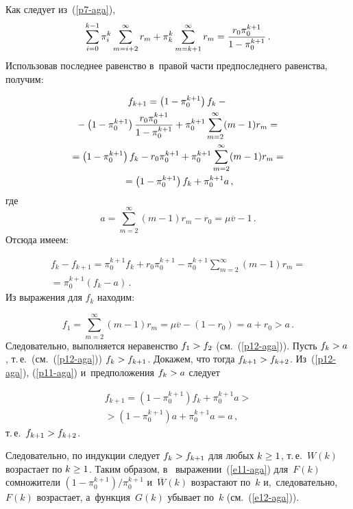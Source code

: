 \begin{multicols}{2}
{Как следует из~(\ref{p7-aga}),
$$
\sum\limits_{i=0}^{k-1} \pi_i^k \sum\limits^\infty_{m=i+2} r_m +\pi_k^k 
\sum\limits^\infty_{m=k+1} r_m = \displaystyle\frac{\displaystyle r_0 \pi_0^{k+1}\mathstrut}{\displaystyle 1-\pi_0^{k+1}\mathstrut}\,.
$$
Использовав последнее равенство в~правой части предпоследнего равенства, 
получим:

\noindent
\begin{multline}
f_{k+1} =\left(1-\pi_0^{k+1}\right) f_k -{}\\
{}-\left( 1-\pi_0^{k+1}\right) 
\displaystyle\frac{\displaystyle r_0\pi_0^{k+1}\mathstrut}{\displaystyle 1-\pi_0^{k+1}\mathstrut}+ \pi_0^{k+1}\sum\limits^\infty_{m=2} (m-
1)r_m={}
\\
{}=\left( 1-\pi_0^{k+1}\right) f_k - r_0 \pi_0^{k+1} +\pi_0^{k+1} 
\sum\limits^\infty_{m=2} (m-1)r_m ={}\\
{}=\left( 1-\pi_0^{k+1}\right) f_k + \pi_0^{k+1} 
a\,,
\label{p11-aga}
\end{multline}
где
$$
a=\sum\limits^\infty_{m=2} (m-1) r_m -r_0 =\mu\overline{v}-1\,.
$$
Отсюда имеем:

\pagebreak

\noindent
\begin{multline}
f_k-f_{k+1} =\pi_0^{k+1} f_k +r_0\pi_0^{k+1} -\pi_0^{k+1} 
\sum\limits^\infty_{m=2} (m-1) r_m ={}\\
{}= \pi_0^{k+1}\left( f_k-a\right)\,.
\label{p12-aga}
\end{multline}
Из выражения для $f_k$ находим:


\noindent
$$
f_1=\sum\limits^\infty_{m=2} (m-1)r_m =\mu\overline{v} -\left( 1-r_0\right) 
=a+r_0> a\,.
$$
Следовательно, выполняется неравенство $f_1\hm> f_2$ (см.~(\ref{p12-aga})). 
Пусть $f_k\hm>a$, т.\,е.\ (см.~(\ref{p12-aga})) $f_k\hm> f_{k+1}$. Докажем, что 
тогда $f_{k+1}\hm> f_{k+2}$. Из~(\ref{p12-aga}), (\ref{p11-aga}) 
и~предположения $f_k\hm>a$ следует

\vspace*{-6pt}

\noindent
\begin{multline*}
f_{k+1} =\left( 1-\pi_0^{k+1}\right) f_k +\pi_0^{k+1} a> {}\\
{}>\left( 1-\pi_0^{k+1}\right) 
a +\pi_0^{k+1} a=a\,,
\end{multline*}
т.\,е.\ $f_{k+1}\hm> f_{k+2}$. 
  
Следовательно, по индукции следует $f_k\hm> f_{k+1}$ для любых $k\hm\geq 
1$, т.\,е.~$W(k)$ возрастает по $k\hm\geq 1$. Таким образом, в~
выражении~(\ref{e11-aga}) для~$F(k)$ сомножители $(1-
\pi_0^{k+1})/\pi_0^{k+1}$ и~$\overline{W}(k)$ возрастают по~$k$ 
и,~следовательно, $F(k)$ возрастает, а~функция~$G(k)$ убывает по~$k$ 
(см.~(\ref{e12-aga})). 

}
\end{multicols}
